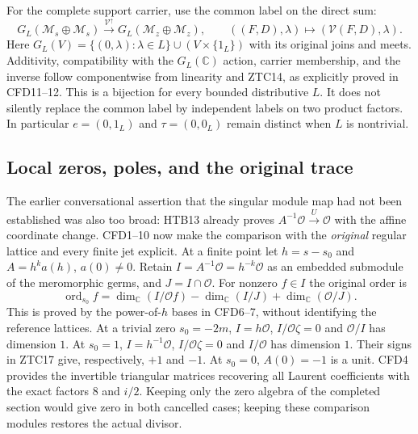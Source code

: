 For the complete support carrier, use the common label on the
direct sum:
\begin{equation}\tag{ZTC16}
 G_L(\mathcal M_s\oplus\mathcal M_s)
   \xrightarrow{\mathcal V^\uparrow}
 G_L(\mathcal M_z\oplus\mathcal M_z),\qquad
 ((F,D),\lambda)\longmapsto(\mathcal V(F,D),\lambda).
\end{equation}
Here $G_L(V)=\{(0,\lambda):\lambda\in L\}\cup(V\times\{1_L\})$
with its original joins and meets. Additivity, compatibility with
the $G_L(\mathbb C)$ action, carrier membership, and the inverse
follow componentwise from linearity and ZTC14, as explicitly proved
in CFD11--12. This is a bijection for every bounded distributive $L$.
It does not silently replace the common label by independent labels
on two product factors. In particular $e=(0,1_L)$ and
$\tau=(0,0_L)$ remain distinct when $L$ is nontrivial.

\subsection{Local zeros, poles, and the original trace}

The earlier conversational assertion that the singular module map
had not been established was also too broad: HTB13 already proves
$A^{-1}\mathcal O\xrightarrow{U}\mathcal O$ with the affine
coordinate change. CFD1--10 now make the comparison with the
\emph{original} regular lattice and every finite jet explicit.
At a finite point let $h=s-s_0$ and $A=h^k a(h)$, $a(0)\ne0$.
Retain $I=A^{-1}\mathcal O=h^{-k}\mathcal O$ as an embedded
submodule of the meromorphic germs, and $J=I\cap\mathcal O$.
For nonzero $f\in I$ the original order is
\begin{equation}\tag{ZTC17}
 \operatorname{ord}_{s_0}f
 =\dim_{\mathbb C}(I/\mathcal O f)
  -\dim_{\mathbb C}(I/J)
  +\dim_{\mathbb C}(\mathcal O/J).
\end{equation}
This is proved by the power-of-$h$ bases in CFD6--7, without
identifying the reference lattices. At a trivial zero $s_0=-2m$,
$I=h\mathcal O$, $I/\mathcal O\zeta=0$ and
$\mathcal O/I$ has dimension $1$. At $s_0=1$,
$I=h^{-1}\mathcal O$, $I/\mathcal O\zeta=0$ and
$I/\mathcal O$ has dimension $1$. Their signs in ZTC17 give,
respectively, $+1$ and $-1$. At $s_0=0$, $A(0)=-1$ is a unit.
CFD4 provides the invertible triangular matrices recovering all
Laurent coefficients with the exact factors $8$ and $i/2$.
Keeping only the zero algebra of the completed section would give
zero in both cancelled cases; keeping these comparison modules
restores the actual divisor.

